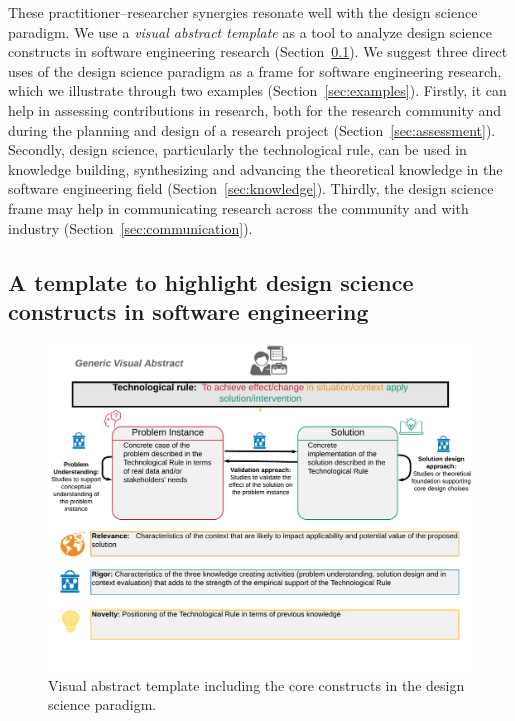 \documentclass[graybox]{svmult}
\begin{document}
These practitioner--researcher synergies resonate well with the design science paradigm.  We use a \emph{visual abstract template} as a tool to analyze design science constructs in software engineering research (Section~\ref{sec:VA_template}). We suggest three direct uses of the design science paradigm as a frame for software engineering research, which we illustrate through two examples (Section~\ref{sec:examples}). Firstly, it can help in assessing contributions in research, both for the research community and during the planning and design of a research project (Section~\ref{sec:assessment}). Secondly, design science, particularly the technological rule, can be used in knowledge building, synthesizing and advancing the theoretical knowledge in the software engineering field (Section~\ref{sec:knowledge}). Thirdly, the design science frame may help in communicating research across the community and with industry (Section~\ref{sec:communication}). 


\subsection{A template to highlight design science constructs in software engineering}
\label{sec:VA_template}


\begin{figure}[t]
  \includegraphics[width=1.0\textwidth]{Figures/GenericVA.png}
\caption{Visual abstract template including the core constructs in the design science paradigm.}
\label{fig:VA-template}       %
\end{figure}
\end{document}
